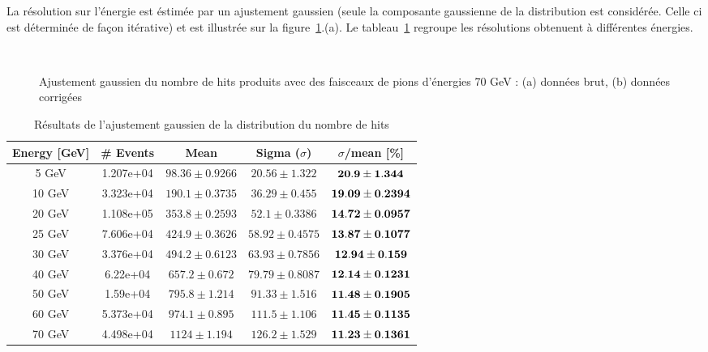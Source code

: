 La r\'esolution sur l'\'energie est \'estim\'ee par un ajustement gaussien (seule la composante gaussienne de la distribution est considérée. Celle ci est déterminée de façon itérative) et est illustr\'ee sur la figure~\ref{figure:5.3}.(a). Le tableau~\ref{tab:5.1} regroupe les résolutions obtenuent à différentes énergies.

\begin{figure}[H]
  \centering 
  \mbox{ }
  \caption{Ajustement gaussien du nombre de hits produits avec des faisceaux de pions d'énergies 70 GeV :  (a) données brut, (b) données corrigées} 
  \label{figure:5.3}
\end{figure}
\vfill%
\begin{table}[H]
  \begin{center}
    \begin{tabular}{|c|c|c|c|c|} \hline
      Energy [GeV] & \# Events & Mean & Sigma ($\sigma$) & $\sigma$/mean [\%] \\ \hline
      5 GeV &1.207e+04 & $98.36\pm0.9266$&$20.56\pm1.322$ & $ \bf20.9\pm1.344$ \\ \hline
      10 GeV &3.323e+04 & $190.1\pm0.3735$&$36.29\pm0.455$ & $ \bf19.09\pm0.2394$ \\ \hline
      20 GeV &1.108e+05 & $353.8\pm0.2593$&$52.1\pm0.3386$ & $ \bf14.72\pm0.0957$ \\ \hline
      25 GeV &7.606e+04 & $424.9\pm0.3626$&$58.92\pm0.4575$ & $ \bf13.87\pm0.1077$ \\ \hline
      30 GeV &3.376e+04 & $494.2\pm0.6123$&$63.93\pm0.7856$ & $ \bf12.94\pm0.159$ \\ \hline
      40 GeV &6.22e+04 & $657.2\pm0.672$&$79.79\pm0.8087$ & $ \bf12.14\pm0.1231$ \\ \hline
      50 GeV &1.59e+04 & $795.8\pm1.214$&$91.33\pm1.516$ & $ \bf11.48\pm0.1905$ \\ \hline
      60 GeV &5.373e+04 & $974.1\pm0.895$&$111.5\pm1.106$ & $ \bf11.45\pm0.1135$ \\ \hline
      70 GeV &4.498e+04 & $1124\pm1.194$&$126.2\pm1.529$ & $ \bf11.23\pm0.1361$ \\ \hline
    \end{tabular}
    \caption{Résultats de l'ajustement gaussien de la distribution du nombre de hits}
    \label{tab:5.1}
  \end{center} 
\end{table}

